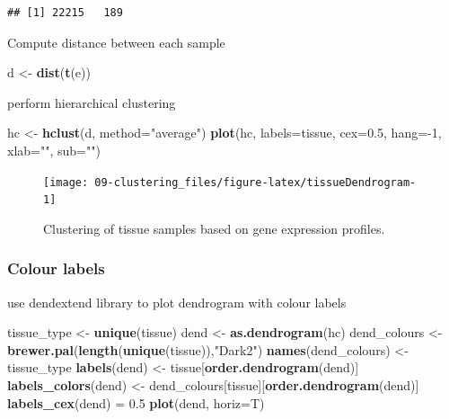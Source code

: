 \documentclass[]{book}
\newenvironment{Shaded}{\begin{snugshade}}{\end{snugshade}}
\newcommand{\KeywordTok}[1]{\textcolor[rgb]{0.13,0.29,0.53}{\textbf{{#1}}}}
\newcommand{\DataTypeTok}[1]{\textcolor[rgb]{0.13,0.29,0.53}{{#1}}}
\newcommand{\DecValTok}[1]{\textcolor[rgb]{0.00,0.00,0.81}{{#1}}}
\newcommand{\FloatTok}[1]{\textcolor[rgb]{0.00,0.00,0.81}{{#1}}}
\newcommand{\StringTok}[1]{\textcolor[rgb]{0.31,0.60,0.02}{{#1}}}
\newcommand{\NormalTok}[1]{{#1}}
\theoremstyle{definition}
\theoremstyle{definition}
\theoremstyle{definition}
\theoremstyle{remark}
\begin{document}
\begin{verbatim}
## [1] 22215   189
\end{verbatim}

Compute distance between each sample

\begin{Shaded}
\begin{Highlighting}[]
\NormalTok{d <-}\StringTok{ }\KeywordTok{dist}\NormalTok{(}\KeywordTok{t}\NormalTok{(e))}
\end{Highlighting}
\end{Shaded}

perform hierarchical clustering

\begin{Shaded}
\begin{Highlighting}[]
\NormalTok{hc <-}\StringTok{ }\KeywordTok{hclust}\NormalTok{(d, }\DataTypeTok{method=}\StringTok{"average"}\NormalTok{)}
\KeywordTok{plot}\NormalTok{(hc, }\DataTypeTok{labels=}\NormalTok{tissue, }\DataTypeTok{cex=}\FloatTok{0.5}\NormalTok{, }\DataTypeTok{hang=}\NormalTok{-}\DecValTok{1}\NormalTok{, }\DataTypeTok{xlab=}\StringTok{""}\NormalTok{, }\DataTypeTok{sub=}\StringTok{""}\NormalTok{)}
\end{Highlighting}
\end{Shaded}

\begin{figure}

{\centering \texttt{[image: 09-clustering\_files/figure-latex/tissueDendrogram-1]} 

}

\caption{Clustering of tissue samples based on gene expression profiles. }\label{fig:tissueDendrogram}
\end{figure}

\subsubsection{Colour labels}\label{colour-labels}

use dendextend library to plot dendrogram with colour labels

\begin{Shaded}
\begin{Highlighting}[]
\NormalTok{tissue_type <-}\StringTok{ }\KeywordTok{unique}\NormalTok{(tissue)}
\NormalTok{dend <-}\StringTok{ }\KeywordTok{as.dendrogram}\NormalTok{(hc)}
\NormalTok{dend_colours <-}\StringTok{ }\KeywordTok{brewer.pal}\NormalTok{(}\KeywordTok{length}\NormalTok{(}\KeywordTok{unique}\NormalTok{(tissue)),}\StringTok{"Dark2"}\NormalTok{)}
\KeywordTok{names}\NormalTok{(dend_colours) <-}\StringTok{ }\NormalTok{tissue_type}
\KeywordTok{labels}\NormalTok{(dend) <-}\StringTok{ }\NormalTok{tissue[}\KeywordTok{order.dendrogram}\NormalTok{(dend)]}
\KeywordTok{labels_colors}\NormalTok{(dend) <-}\StringTok{ }\NormalTok{dend_colours[tissue][}\KeywordTok{order.dendrogram}\NormalTok{(dend)]}
\KeywordTok{labels_cex}\NormalTok{(dend) =}\StringTok{ }\FloatTok{0.5}
\KeywordTok{plot}\NormalTok{(dend, }\DataTypeTok{horiz=}\NormalTok{T)}
\end{Highlighting}
\end{Shaded}
\end{document}
